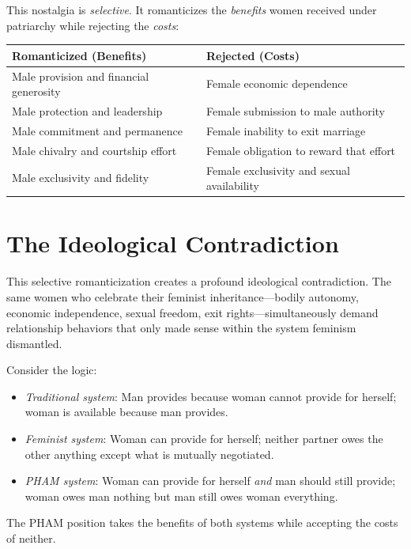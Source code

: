 \documentclass[12pt,openany]{book}
\numberwithin{equation}{chapter}
\begin{document}
This nostalgia is \textit{selective}. It romanticizes the \textit{benefits} women received under patriarchy while rejecting the \textit{costs}:

\begin{center}
\begin{tabular}{|p{3in}|p{3in}|}
\hline
\textbf{Romanticized (Benefits)} & \textbf{Rejected (Costs)} \\
\hline
Male provision and financial generosity & Female economic dependence \\
\hline
Male protection and leadership & Female submission to male authority \\
\hline
Male commitment and permanence & Female inability to exit marriage \\
\hline
Male chivalry and courtship effort & Female obligation to reward that effort \\
\hline
Male exclusivity and fidelity & Female exclusivity and sexual availability \\
\hline
\end{tabular}
\end{center}

\section{The Ideological Contradiction}

This selective romanticization creates a profound ideological contradiction. The same women who celebrate their feminist inheritance---bodily autonomy, economic independence, sexual freedom, exit rights---simultaneously demand relationship behaviors that only made sense within the system feminism dismantled.

Consider the logic:
\begin{itemize}
    \item \textit{Traditional system}: Man provides because woman cannot provide for herself; woman is available because man provides.
    \item \textit{Feminist system}: Woman can provide for herself; neither partner owes the other anything except what is mutually negotiated.
    \item \textit{PHAM system}: Woman can provide for herself \textit{and} man should still provide; woman owes man nothing but man still owes woman everything.
\end{itemize}

The PHAM position takes the benefits of both systems while accepting the costs of neither.
\end{document}
